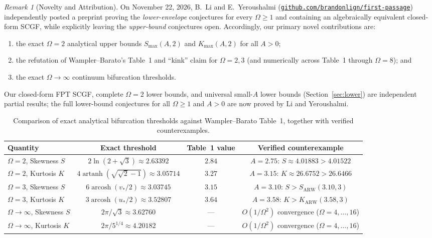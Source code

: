 \documentclass[11pt]{article}
\theoremstyle{definition}
\theoremstyle{remark}
\newtheorem*{remark}{Remark}
\DeclareMathOperator{\artanh}{artanh}
\DeclareMathOperator{\arcosh}{arcosh}
\begin{document}
\begin{remark}[Novelty and Attribution]
On November 22, 2026, B.~Li and E.~Yeroushalmi (\href{https://github.com/brandonlign/first-passage}{\texttt{github.com/\allowbreak brandonlign/\allowbreak first-passage}}) independently posted a preprint proving the \emph{lower-envelope} conjectures for every $\Omega \ge 1$ and containing an algebraically equivalent closed-form SCGF, while explicitly leaving the \emph{upper-bound} conjectures open. Accordingly, our primary novel contributions are:
\begin{enumerate}[leftmargin=2em,itemsep=2pt]
  \item the exact $\Omega = 2$ analytical upper bounds $S_{\max}(A,2)$ and $K_{\max}(A,2)$ for all $A > 0$;
  \item the refutation of Wampler--Barato's Table~1 and ``kink'' claim for $\Omega = 2, 3$ (and numerically across Table~1 through $\Omega = 8$); and
  \item the exact $\Omega \to \infty$ continuum bifurcation thresholds.
\end{enumerate}
Our closed-form FPT SCGF, complete $\Omega = 2$ lower bounds, and universal small-$A$ lower bounds (Section~\ref{sec:lower}) are independent partial results; the full lower-bound conjectures for all $\Omega \ge 1$ and $A > 0$ are now proved by Li and Yeroushalmi.
\end{remark}

\begin{table}[ht]
\centering
\small
\setlength{\tabcolsep}{4pt}
\caption{Comparison of exact analytical bifurcation thresholds against Wampler--Barato Table~1, together with verified counterexamples.}
\label{tab:thresholds}
\begin{tabular}{@{}lccc@{}}
\toprule
Quantity & Exact threshold & Table~1 value & Verified counterexample \\
\midrule
$\Omega = 2$, Skewness $S$ & $2\ln(2+\sqrt{3}) \approx 2.63392$ & $2.84$ & $A = 2.75$: $S \approx 4.01883 > 4.01522$ \\
$\Omega = 2$, Kurtosis $K$ & $4\artanh(\sqrt{\sqrt{2}-1}) \approx 3.05714$ & $3.27$ & $A = 3.15$: $K \approx 26.6752 > 26.6466$ \\
$\Omega = 3$, Skewness $S$ & $6\arcosh(v_*/2) \approx 3.03745$ & $3.15$ & $A = 3.10$: $S > S_{\mathrm{ARW}}(3.10, 3)$ \\
$\Omega = 3$, Kurtosis $K$ & $3\arcosh(u_*/2) \approx 3.52807$ & $3.64$ & $A = 3.58$: $K > K_{\mathrm{ARW}}(3.58, 3)$ \\
$\Omega \to \infty$, Skewness $S$ & $2\pi/\sqrt{3} \approx 3.62760$ & --- & $O(1/\Omega^2)$ convergence ($\Omega=4,\dots,16$) \\
$\Omega \to \infty$, Kurtosis $K$ & $2\pi/5^{1/4} \approx 4.20182$ & --- & $O(1/\Omega^2)$ convergence ($\Omega=4,\dots,16$) \\
\bottomrule
\end{tabular}
\end{table}
\end{document}
